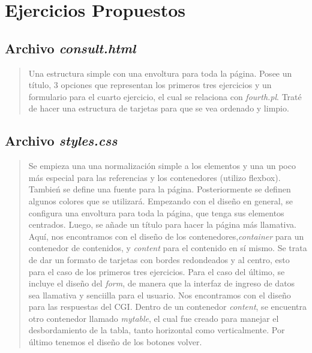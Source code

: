 \documentclass{article}
\begin{document}
	\section{Ejercicios Propuestos}

  \subsection{Archivo \textit{consult.html}}

  

  \begin{quote}
    Una estructura simple con una envoltura para toda la página. Posee un título, 3 opciones que representan los primeros tres ejercicios y un formulario para el cuarto ejercicio, el cual se relaciona con \textit{fourth.pl}. Traté de hacer una estructura de tarjetas para que se vea ordenado y limpio. 
  \end{quote}

  \subsection{Archivo \textit{styles.css}}

  

  \begin{quote}
    Se empieza una una normalización simple a los elementos y una un poco más especial para las referencias y los contenedores (utilizo flexbox). Tambień se define una fuente para la página. Posteriormente se definen algunos colores que se utilizará.
    Empezando con el diseño en general, se configura una envoltura para toda la página, que tenga sus elementos centrados. Luego, se añade un título para hacer la página más llamativa.
    Aquí, nos encontramos con el diseño de los contenedores,\textit{container} para un contenedor de contenidos, y \textit{content} para el contenido en sí mismo. Se trata de dar un formato de tarjetas con bordes redondeados y al centro, esto para el caso de los primeros tres ejercicios. Para el caso del último, se incluye el diseño del \textit{form}, de manera que la interfaz de ingreso de datos sea llamativa y senciilla para el usuario.
    Nos encontramos con el diseño para las respuestas del CGI. Dentro de un contenedor \textit{content}, se encuentra otro contenedor llamado \textit{mytable}, el cual fue creado para manejar el desbordamiento de la tabla, tanto horizontal como verticalmente.
    Por último tenemos el diseño de los botones volver.
  \end{quote}
\end{document}
